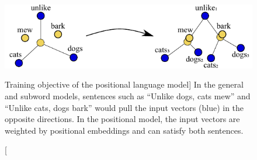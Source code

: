 \begin{figure}
\includegraphics{positional-model}
\caption
  [Training objective of the positional language model]%
  {In the general and subword models, sentences such as
   ``Unlike dogs, cats mew'' and ``Unlike cats, dogs bark''
   would pull the input vectors (blue) in the opposite directions.  In the
   positional model, the input vectors are weighted by positional embeddings
   and can satisfy both sentences.}
\label{fig:positional-model}
\end{figure}

